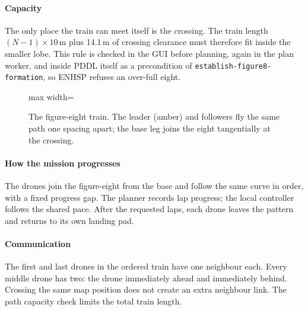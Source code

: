 \documentclass[11pt,a4paper,oneside]{report}
\newcommand{\code}[1]{\texttt{#1}}
\begin{document}
\paragraph{Capacity}
The only place the train can meet itself is the crossing. The train length $(N-1)\times10$\,m
plus 14.1\,m of crossing clearance must therefore fit inside the smaller lobe. This rule is
checked in the GUI before planning, again in the plan worker, and inside PDDL itself as a
precondition of \code{establish-figure8-formation}, so ENHSP refuses an over-full eight.

\begin{figure}[H]
\centering
\begin{adjustbox}{max width=\linewidth}
\end{adjustbox}
\caption[Figure-eight route]{The figure-eight train. The leader (amber) and followers fly the same path one spacing
apart; the base leg joins the eight tangentially at the crossing.}
\label{fig:fig8}
\end{figure}


\paragraph{How the mission progresses}
The drones join the figure-eight from the base and follow the same curve in order, with a fixed progress gap. The planner records lap progress; the local controller follows the shared pace. After the requested laps, each drone leaves the pattern and returns to its own landing pad.

\paragraph{Communication}
The first and last drones in the ordered train have one neighbour each. Every middle drone has two: the drone immediately ahead and immediately behind. Crossing the same map position does not create an extra neighbour link. The path capacity check limits the total train length.
\end{document}
